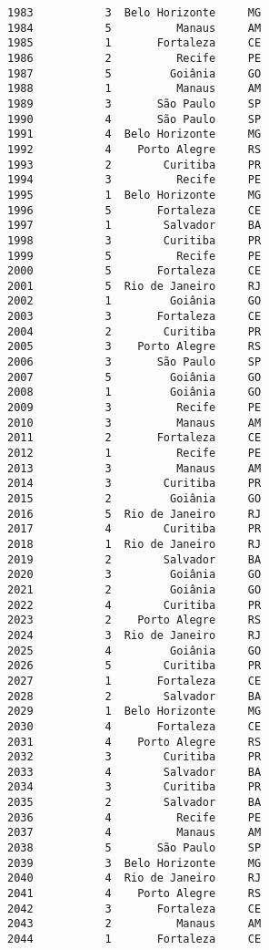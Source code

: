 \documentclass[11pt]{article}
\begin{document}
\begin{Verbatim}[commandchars=\\\{\}]
1983           3  Belo Horizonte     MG  
1984           5          Manaus     AM  
1985           1       Fortaleza     CE  
1986           2          Recife     PE  
1987           5         Goiânia     GO  
1988           1          Manaus     AM  
1989           3       São Paulo     SP  
1990           4       São Paulo     SP  
1991           4  Belo Horizonte     MG  
1992           4    Porto Alegre     RS  
1993           2        Curitiba     PR  
1994           3          Recife     PE  
1995           1  Belo Horizonte     MG  
1996           5       Fortaleza     CE  
1997           1        Salvador     BA  
1998           3        Curitiba     PR  
1999           5          Recife     PE  
2000           5       Fortaleza     CE  
2001           5  Rio de Janeiro     RJ  
2002           1         Goiânia     GO  
2003           3       Fortaleza     CE  
2004           2        Curitiba     PR  
2005           3    Porto Alegre     RS  
2006           3       São Paulo     SP  
2007           5         Goiânia     GO  
2008           1         Goiânia     GO  
2009           3          Recife     PE  
2010           3          Manaus     AM  
2011           2       Fortaleza     CE  
2012           1          Recife     PE  
2013           3          Manaus     AM  
2014           3        Curitiba     PR  
2015           2         Goiânia     GO  
2016           5  Rio de Janeiro     RJ  
2017           4        Curitiba     PR  
2018           1  Rio de Janeiro     RJ  
2019           2        Salvador     BA  
2020           3         Goiânia     GO  
2021           2         Goiânia     GO  
2022           4        Curitiba     PR  
2023           2    Porto Alegre     RS  
2024           3  Rio de Janeiro     RJ  
2025           4         Goiânia     GO  
2026           5        Curitiba     PR  
2027           1       Fortaleza     CE  
2028           2        Salvador     BA  
2029           1  Belo Horizonte     MG  
2030           4       Fortaleza     CE  
2031           4    Porto Alegre     RS  
2032           3        Curitiba     PR  
2033           4        Salvador     BA  
2034           3        Curitiba     PR  
2035           2        Salvador     BA  
2036           4          Recife     PE  
2037           4          Manaus     AM  
2038           5       São Paulo     SP  
2039           3  Belo Horizonte     MG  
2040           4  Rio de Janeiro     RJ  
2041           4    Porto Alegre     RS  
2042           3       Fortaleza     CE  
2043           2          Manaus     AM  
2044           1       Fortaleza     CE  

\end{Verbatim}
\end{document}
